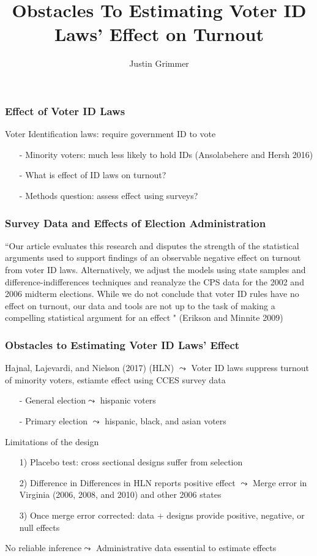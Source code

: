 \documentclass{beamer}
\title[Voter ID] %
{Obstacles To Estimating Voter ID Laws' Effect on Turnout}
\author{Justin Grimmer}
\institute[University of Chicago]{Associate Professor\\Department of Political Science \\  University of Chicago\\
 with Eitan Hersh, Marc Meredith, Jonathan Mummolo, and Clayton Nall
}
\numberwithin{equation}{section}
\begin{document}
\begin{frame}
\titlepage
\end{frame}

\begin{frame}
\frametitle{Effect of Voter ID Laws}

Voter Identification laws: require government ID to vote

\begin{itemize}
	\item[-] Minority voters: much less likely to hold IDs (Ansolabehere and Hersh 2016)
	\item[-] What is effect of ID laws on turnout?
	\item[-] Methods question: assess effect using surveys?
\end{itemize}

\end{frame}


\begin{frame}
\frametitle{Survey Data and Effects of Election Administration}

``Our article evaluates
this research and disputes the strength of
the statistical arguments used to support findings
of an observable negative effect on turnout
from voter ID laws. Alternatively, we adjust the
models using state samples and difference-indifferences
techniques and reanalyze the CPS
data for the 2002 and 2006 midterm elections.
While we do not conclude that voter ID rules
have no effect on turnout, \alert{our data and tools
are not up to the task of making a compelling
statistical argument for an effect} " (Erikson and Minnite 2009)


\end{frame}


\begin{frame}
\frametitle{Obstacles to Estimating Voter ID Laws' Effect}

Hajnal, Lajevardi, and Nielson (2017) (HLN) $\leadsto$ Voter ID laws suppress turnout of minority voters, estiamte effect using CCES survey data
\begin{itemize}
	\item[-] General election$\leadsto$ hispanic voters
	\item[-] Primary election $\leadsto$ hispanic, black, and asian voters
\end{itemize}

Limitations of the design
\begin{itemize}
	\item[1)] Placebo test: cross sectional designs suffer from selection 
	\item[2)] Difference in Differences in HLN reports positive effect $\leadsto$ Merge error in Virginia (2006, 2008, and 2010) and other 2006 states
	\item[3)] Once merge error corrected: data + designs provide positive, negative, or null effects
\end{itemize}	

\alert{No reliable inference$\leadsto$ Administrative data essential to estimate effects}
\end{frame}
\end{document}
